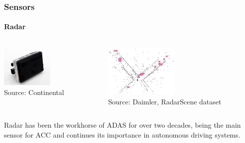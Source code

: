 \begin{frame}
\end{frame}

\begin{frame}
\frametitle{Sensors}
\framesubtitle{Radar}
\begin{columns}[b]
    \begin{column}{.5\textwidth}
        \centering
        \includegraphics[height=2.0cm]{images/continental_radar.jpg}\\
        \vspace{0.2cm}
        \tiny{Source: Continental\footnotemark[1]}
    \end{column}
    \begin{column}{.5\textwidth}
        \centering
        \includegraphics[height=2.5cm]{images/daimler_radar_dataset.png}\\
        \tiny{Source: Daimler, RadarScene dataset\footnotemark[2]}
    \end{column}
\end{columns}

\vspace{0.2cm}

\footnotesize
Radar has been the workhorse of ADAS for over two decades, being the main
sensor for ACC and continues its importance in autonomous driving systems.


\end{frame}
